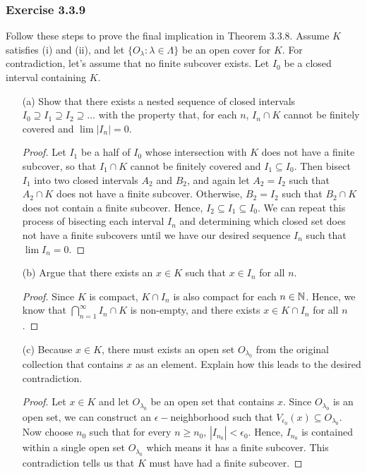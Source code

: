 \subsubsection{Exercise 3.3.9} Follow these steps to prove the final implication in Theorem 3.3.8. 
Assume \( K \) satisfies (i) and (ii), and let \( \{ O_{\lambda} : \lambda \in \Lambda  \}  \) be an open cover for \( K \). For contradiction, let's assume that no finite subcover exists. Let \( I_0  \) be a closed interval containing \( K \).
\begin{enumerate}
    \item[(a)] Show that there exists a nested sequence of closed intervals \( I_0 \supseteq I_1 \supseteq I_2 \supseteq \dots \) with the property that, for each \( n  \), \( I_n \cap K \) cannot be finitely covered and \( \lim | I_n | = 0  \).
        \begin{proof}
        Let \( I_1  \) be a half of \( I_0 \) whose intersection with \( K \) does not have a finite subcover, so that \( I_1 \cap K \) cannot be finitely covered and \( I_1 \subseteq I_0  \). Then bisect \( I_1  \) into two closed intervals \( A_2 \) and \( B_2 \), and again let \( A_2 = I_2  \) such that \( A_2 \cap K  \) does not have a finite subcover. Otherwise, \( B_2 = I_2  \) such that \( B_2 \cap K \) does not contain a finite subcover. Hence, \( I_2 \subseteq I_1 \subseteq I_0 \). We can repeat this process of bisecting each interval \( I_n  \) and determining which closed set does not have a finite subcovers until we have our desired sequence \( I_n \) such that \( \lim I_n = 0 \).
    \end{proof}
    \item[(b)] Argue that there exists an \( x \in K \) such that \( x \in I_n \) for all \( n \).
        \begin{proof}
        Since \( K \) is compact, \( K \cap I_n \) is also compact for each \( n \in \mathbb{N} \). Hence, we know that \( \bigcap_{ n=1 }^{ \infty  } I_n \cap K \) is non-empty, and there exists \( x \in K \cap I_n \) for all \( n \).
        \end{proof}
    \item[(c)] Because \( x \in K \), there must exists an open set \( O_{\lambda_0} \) from the original collection that contains \( x  \) as an element. Explain how this leads to the desired contradiction.
\begin{proof}
    Let \( x \in K \) and let \( O_{\lambda_0} \) be an open set that contains \( x \). Since \( O_{\lambda_0} \) is an open set, we can construct an \( \epsilon - \)neighborhood such that \( V_{\epsilon_0 }(x) \subseteq O_{\lambda_0} \). Now choose \( n_0  \) such that for every \( n \geq n_0 \), \( | I_{n_0}| < \epsilon_0  \). Hence, \( I_{n_0} \) is contained within a single open set \( O_{\lambda_0} \) which means it has a finite subcover. This contradiction tells us that \( K \) must have had a finite subcover.
\end{proof}
\end{enumerate}

